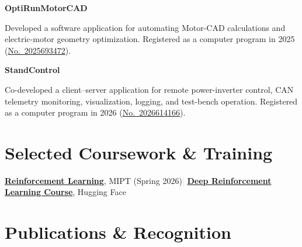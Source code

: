\documentclass[10pt,a4paper]{article}
\newcommand{\project}[2]{%
  \needspace{3\baselineskip}
  {\sffamily\bfseries #1}\par
  \vspace{0.12em}
  #2
}
\begin{document}
\vspace{0.25em}
\project{OptiRunMotorCAD}{
  Developed a software application for automating Motor-CAD calculations and
  electric-motor geometry optimization. Registered as a computer program in
  2025
  (\href{https://new.fips.ru/registers-doc-view/fips_servlet?DB=EVM\&DocNumber=2025693472\&TypeFile=html}{No.~2025693472}).
}

\vspace{0.4em}
\project{StandControl}{
  Co-developed a client--server application for remote power-inverter control,
  CAN telemetry monitoring, visualization, logging, and test-bench operation.
  Registered as a computer program in 2026
  (\href{https://new.fips.ru/registers-doc-view/fips_servlet?DB=EVM\&DocNumber=2026614166\&TypeFile=html}{No.~2026614166}).
}

\section{Selected Coursework \& Training}

\href{https://mipt.ru/institute/events/alternativnyy-kurs-obuchenie-s-podkrepleniem-vesna-2026}{\textbf{Reinforcement Learning}},
MIPT (Spring 2026)\hspace{0.8em}\textcolor{lightgray}{|}\hspace{0.8em}
\href{https://huggingface.co/learn/deep-rl-course}{\textbf{Deep Reinforcement Learning Course}},
Hugging Face

\section{Publications \& Recognition}
\end{document}
